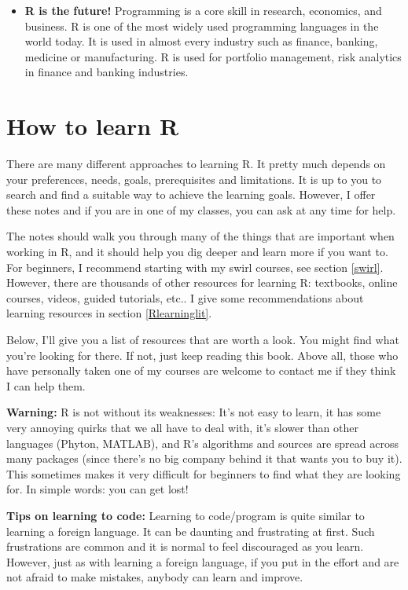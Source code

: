 \documentclass[
  12pt,
  oneside]{book}
\theoremstyle{definition}
\theoremstyle{definition}
\theoremstyle{definition}
\theoremstyle{definition}
\theoremstyle{remark}
\begin{document}
\begin{itemize}
\item
  \textbf{R is the future!} Programming is a core skill in research, economics, and business. R is one of the most widely used programming languages in the world today. It is used in almost every industry such as finance, banking, medicine or manufacturing. R is used for portfolio management, risk analytics in finance and banking industries.
\end{itemize}

\hypertarget{howtolearnr}{%
\section{How to learn R}\label{howtolearnr}}

There are many different approaches to learning R. It pretty much depends on your preferences, needs, goals, prerequisites and limitations. It is up to you to search and find a suitable way to achieve the learning goals. However, I offer these notes and if you are in one of my classes, you can ask at any time for help.

The notes should walk you through many of the things that are important when working in R, and it should help you dig deeper and learn more if you want to. For beginners, I recommend starting with my swirl courses, see section \ref{swirl}. However, there are thousands of other resources for learning R: textbooks, online courses, videos, guided tutorials, etc.. I give some recommendations about learning resources in section \ref{Rlearninglit}.

Below, I'll give you a list of resources that are worth a look. You might find what you're looking for there. If not, just keep reading this book. Above all, those who have personally taken one of my courses are welcome to contact me if they think I can help them.

\textbf{Warning:} R is not without its weaknesses: It's not easy to learn, it has some very annoying quirks that we all have to deal with, it's slower than other languages (Phyton, MATLAB), and R's algorithms and sources are spread across many packages (since there's no big company behind it that wants you to buy it). This sometimes makes it very difficult for beginners to find what they are looking for. In simple words: you can get lost!

\textbf{Tips on learning to code:}
Learning to code/program is quite similar to learning a foreign language. It can be daunting and frustrating at first. Such frustrations are common and it is normal to feel discouraged as you learn. However, just as with learning a foreign language, if you put in the effort and are not afraid to make mistakes, anybody can learn and improve.
\end{document}
